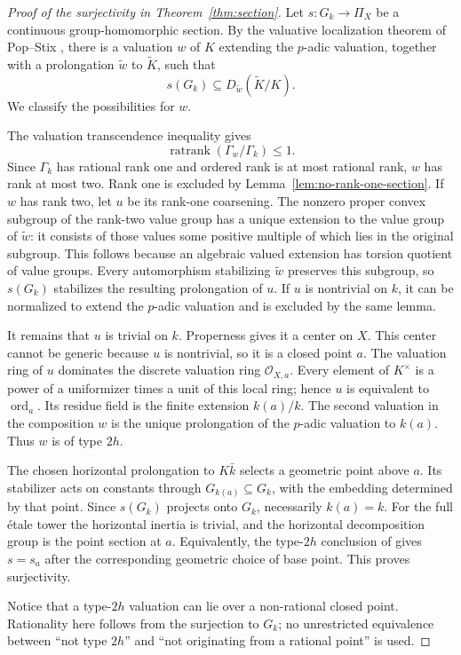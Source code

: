 \begin{proof}[Proof of the surjectivity in Theorem~\ref{thm:section}]
Let $s:G_k\to\Pi_X$ be a continuous group-homomorphic section.
By the valuative localization theorem of Pop--Stix
\cite[preprint version, Theorem~26]{PopStix}, there is a valuation $w$ of $K$ extending
the $p$-adic valuation, together with a prolongation $\widetilde w$ to
$\widetilde K$, such that
\[
 s(G_k)\subseteq D_{\widetilde w}(\widetilde K/K).
\]
We classify the possibilities for $w$.

The valuation transcendence inequality gives
\[
 \operatorname{ratrank}(\Gamma_w/\Gamma_k)\leq 1.
\]
Since $\Gamma_k$ has rational rank one and ordered rank is at most
rational rank, $w$ has rank at most two.  Rank one is excluded by
Lemma~\ref{lem:no-rank-one-section}.  If $w$ has rank two, let $u$ be
its rank-one coarsening.  The nonzero proper convex subgroup of the
rank-two value group has a unique extension to the value group of
$\widetilde w$: it consists of those values some positive multiple of
which lies in the original subgroup.  This follows because an algebraic
valued extension has torsion quotient of value groups.  Every
automorphism stabilizing $\widetilde w$ preserves this subgroup, so
$s(G_k)$ stabilizes the resulting prolongation of $u$.  If $u$
is nontrivial on $k$, it can be normalized to extend the $p$-adic
valuation and is excluded by the same lemma.

It remains that $u$ is trivial on $k$.  Properness gives it a center
on $X$.  This center cannot be generic because $u$ is nontrivial, so
it is a closed point $a$.  The valuation ring of $u$ dominates the
discrete valuation ring $\mathcal O_{X,a}$.  Every element of $K^\times$
is a power of a uniformizer times a unit of this local ring; hence
$u$ is equivalent to $\operatorname{ord}_a$.  Its residue field is the
finite extension $k(a)/k$.  The second valuation in the composition
$w$ is the unique prolongation of the $p$-adic valuation to $k(a)$.
Thus $w$ is of type $2h$.

The chosen horizontal prolongation to $K\bar k$ selects a geometric
point above $a$.  Its stabilizer acts on constants through
$G_{k(a)}\subseteq G_k$, with the embedding determined by that point.
Since $s(G_k)$ projects onto $G_k$, necessarily $k(a)=k$.
For the full \'etale tower the horizontal inertia is trivial, and the
horizontal decomposition group is the point section at $a$.
Equivalently, the type-$2h$ conclusion of
\cite[preprint version, Section~6.1]{PopStix} gives $s=s_a$ after the corresponding
geometric choice of base point.  This proves surjectivity.

Notice that a type-$2h$ valuation can lie over a non-rational closed
point.  Rationality here follows from the surjection to $G_k$; no
unrestricted equivalence between ``not type $2h$'' and ``not originating
from a rational point'' is used.
\end{proof}

